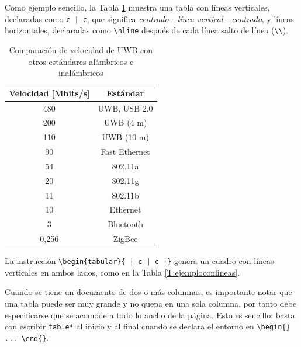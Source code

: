\documentclass[12pt,letterpaper]{article}
\begin{document}
Como ejemplo sencillo, la Tabla \ref{T:ejemplo} muestra una tabla con líneas verticales, declaradas como \verb+c | c+, que significa \textit{centrado - línea vertical - centrado}, y líneas horizontales, declaradas como \verb+\hline+ después de cada línea salto de línea (\verb+\\+).

\begin{table}
\caption{Comparación de velocidad de UWB con otros estándares alámbricos e inalámbricos}
\label{T:ejemplo}
\begin{center}
\begin{tabular}{ c | c}
\hline
\textbf{Velocidad [Mbits/s]} & \textbf{Estándar} \\ 
\hline
480 & UWB, USB 2.0 \\ 
200 & UWB (4 m) \\
110 & UWB (10 m) \\ 
90 & Fast Ethernet \\ 
54 & 802.11a \\ 
20 & 802.11g \\ 
11 & 802.11b \\ 
10 & Ethernet \\ 
3 & Bluetooth \\ 
0,256 & ZigBee \\ 
\hline
\end{tabular}
\end{center}
\end{table}

La instrucción \verb+\begin{tabular}{ | c | c |}+ genera un cuadro con líneas verticales en ambos lados, como en la Tabla \ref{T:ejemploconlineas}. 

Cuando se tiene un documento de dos o más columnas, es importante notar que una tabla puede ser muy grande y no quepa en una sola columna, por tanto debe especificarse que se acomode a todo lo ancho de la página. Esto es sencillo: basta con escribir \verb+table*+ al inicio y al final cuando se declara el entorno en \verb+\begin{} ... \end{}+.
\end{document}
